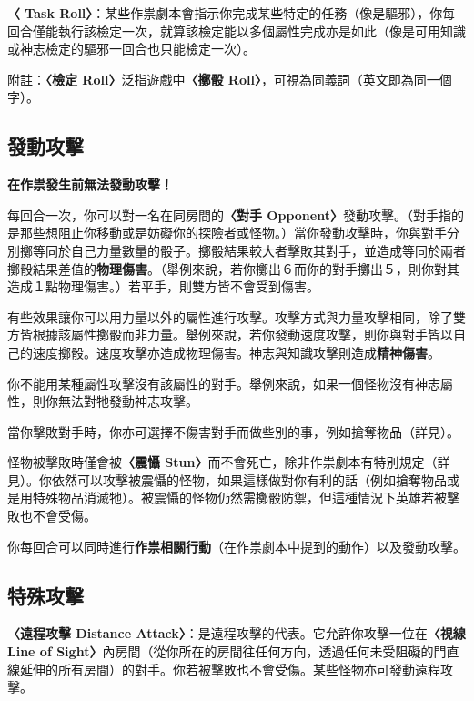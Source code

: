 \textbf{〈 Task Roll〉}：某些作祟劇本會指示你完成某些特定的任務（像是驅邪），你每回合僅能執行該檢定一次，就算該檢定能以多個屬性完成亦是如此（像是可用知識或神志檢定的驅邪一回合也只能檢定一次）。

附註：\textbf{〈檢定 Roll〉}泛指遊戲中\textbf{〈擲骰 Roll〉}，可視為同義詞（英文即為同一個字）。


\subsection{發動攻擊} \label{ssec:make-an-attack}

\textbf{在作祟發生前無法發動攻擊！}

每回合一次，你可以對一名在同房間的\textbf{〈對手 Opponent〉}發動攻擊。（對手指的是那些想阻止你移動或是妨礙你的探險者或怪物。）當你發動攻擊時，你與對手分別擲等同於自己力量數量的骰子。擲骰結果較大者擊敗其對手，並造成等同於兩者擲骰結果差值的\textbf{物理傷害}。（舉例來說，若你擲出６而你的對手擲出５，則你對其造成１點物理傷害。）若平手，則雙方皆不會受到傷害。

有些效果讓你可以用力量以外的屬性進行攻擊。攻擊方式與力量攻擊相同，除了雙方皆根據該屬性擲骰而非力量。舉例來說，若你發動速度攻擊，則你與對手皆以自己的速度擲骰。速度攻擊亦造成物理傷害。神志與知識攻擊則造成\textbf{精神傷害}。

你不能用某種屬性攻擊沒有該屬性的對手。舉例來說，如果一個怪物沒有神志屬性，則你無法對牠發動神志攻擊。

當你擊敗對手時，你亦可選擇不傷害對手而做些別的事，例如搶奪物品（詳見）。

怪物被擊敗時僅會被\textbf{〈震懾 Stun〉}而不會死亡，除非作祟劇本有特別規定（詳見）。你依然可以攻擊被震懾的怪物，如果這樣做對你有利的話（例如搶奪物品或是用特殊物品消滅牠）。被震懾的怪物仍然需擲骰防禦，但這種情況下英雄若被擊敗也不會受傷。

你每回合可以同時進行\textbf{作祟相關行動}（在作祟劇本中提到的動作）以及發動攻擊。


\subsection{特殊攻擊} \label{ssec:special-attacks}

\textbf{〈遠程攻擊 Distance Attack〉}：是遠程攻擊的代表。它允許你攻擊一位在\textbf{〈視線 Line of Sight〉}內房間（從你所在的房間往任何方向，透過任何未受阻礙的門直線延伸的所有房間）的對手。你若被擊敗也不會受傷。某些怪物亦可發動遠程攻擊。


